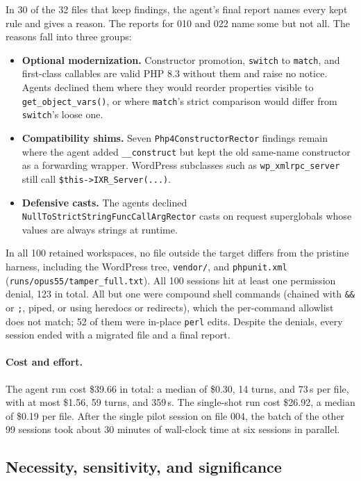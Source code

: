 \documentclass[11pt]{article}
\newcommand{\code}[1]{\texttt{#1}}
\begin{document}
In 30 of the 32 files that keep findings, the agent's final report names every kept rule and gives a reason.
The reports for 010 and 022 name some but not all.
The reasons fall into three groups:
\begin{itemize}
  \item \textbf{Optional modernization.} Constructor promotion, \code{switch} to \code{match}, and first-class callables are valid PHP 8.3 without them and raise no notice. Agents declined them where they would reorder properties visible to \code{get\_object\_vars()}, or where \code{match}'s strict comparison would differ from \code{switch}'s loose one.
  \item \textbf{Compatibility shims.} Seven \code{Php4ConstructorRector} findings remain where the agent added \code{\_\_construct} but kept the old same-name constructor as a forwarding wrapper. WordPress subclasses such as \code{wp\_xmlrpc\_server} still call \code{\$this->IXR\_Server(...)}.
  \item \textbf{Defensive casts.} The agents declined \code{NullToStrictStringFuncCallArgRector} casts on request superglobals whose values are always strings at runtime.
\end{itemize}

In all 100 retained workspaces, no file outside the target differs from the pristine harness, including the WordPress tree, \code{vendor/}, and \code{phpunit.xml} (\code{runs/opus55/tamper\_full.txt}).
All 100 sessions hit at least one permission denial, 123 in total.
All but one were compound shell commands (chained with \code{\&\&} or \code{;}, piped, or using heredocs or redirects), which the per-command allowlist does not match; 52 of them were in-place \code{perl} edits.
Despite the denials, every session ended with a migrated file and a final report.

\paragraph{Cost and effort.}
The agent run cost \$39.66 in total: a median of \$0.30, 14 turns, and 73\,s per file, with at most \$1.56, 59 turns, and 359\,s.
The single-shot run cost \$26.92, a median of \$0.19 per file.
After the single pilot session on file 004, the batch of the other 99 sessions took about 30 minutes of wall-clock time at six sessions in parallel.

\subsection{Necessity, sensitivity, and significance}
\label{sec:necessity}
\end{document}
